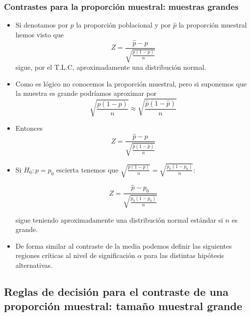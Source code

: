 \begin{frame}
\frametitle{Contrastes para la proporción muestral: muestras grandes}
\begin{itemize}
\item Si denotamos por $p$ la proporción poblacional y por $\hat{p}$ la proporción muestral hemos visto que
      $$Z=\frac{\hat{p}-p}{\sqrt{\frac{p(1-p)}{n}}}$$
sigue, por el T.L.C, aproximadamente una distribución normal.
\item Como es lógico no conocemos la proporción muestral, pero si suponemos que la muestra es grande podríamos aproximar por
      $$\sqrt{\frac{p(1-p)}{n}}\approx \sqrt{\frac{\hat{p}(1-\hat{p})}{n}}$$
\item Entonces $$Z=\frac{\hat{p}-p}{\sqrt{\frac{\hat{p}(1-\hat{p})}{n}}}$$
\end{itemize}
\end{frame}

\begin{frame}
\begin{itemize}
\item Si $H_{0}:p=p_{0}$  escierta tenemos
      que $\sqrt{\frac{p(1-p)}{n}}=\sqrt{\frac{p_{0}(1-p_{0})}{n}}$:

      $$Z=\frac{\hat{p}-p_0}{\sqrt{\frac{p_{0}(1-p_{0})}{n}}}$$

      sigue teniendo aproximadamente una distribución normal estándar
      si $n$ es grande.
\item De forma similar al contraste de la media podemos definir las
      siguientes regiones críticas al nivel de significación $\alpha$
      para las distintas hipótesis alternativas.
\end{itemize}
\end{frame}
\subsection{Reglas de decisión para el contraste de una proporción muestral: tamaño muestral
       grande}

